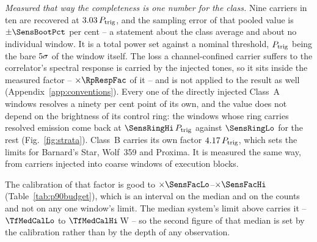 \emph{Measured that way the completeness is one number for the class.} Nine
carriers in ten are recovered at $3.03\,P_{\rm trig}$, and the
sampling error of that pooled value is $\pm\SensBootPct$ per cent -- a
statement about the class average and about no individual window. It is a
total power set against a nominal threshold, $P_{\rm trig}$ being the bare
$5\sigma$ of the window itself. The loss a channel-confined
carrier suffers to the correlator's spectral response is carried by the
injected tones, so it sits inside the measured factor -- $\times\RpRespFac$
of it -- and is not applied to the result as well
(Appendix~\ref{app:conventions}). Every one of the \SensNInj{} directly
injected Class~A windows resolves a ninety per cent point of its own, and the
value does not depend on the brightness of its control ring: the
\SensNRingHi{} windows whose ring carries resolved emission come back at
$\SensRingHi\,P_{\rm trig}$ against $\SensRingLo$ for the rest
(Fig.~\ref{fig:strata}). Class~B carries its own factor $4.17\,P_{\rm trig}$, which
sets the limits for Barnard's Star, Wolf~359 and Proxima. It is measured the
same way, from \SensNToneCoarse{} carriers injected into \SensNInjCoarse{}
coarse windows of \SensNInjCoarseBlock{} execution blocks.

The calibration of that factor is good to
$\times\SensFacLo$--$\times\SensFacHi$ (Table~\ref{tab:p90budget}), which is
an interval on the median and on the counts and not on any one window's
limit. The median system's limit above carries it -- $\TfMedCalLo$ to
$\TfMedCalHi$\,W -- so the second figure of that median is set by the
calibration rather than by the depth of any observation.


